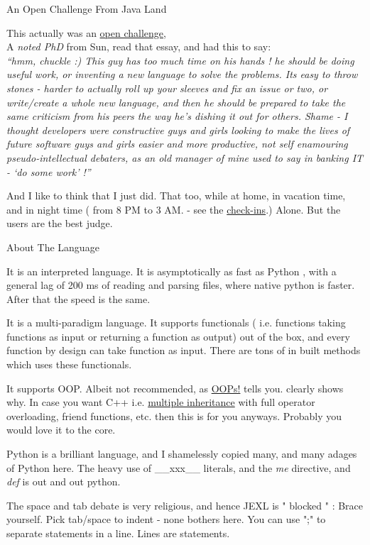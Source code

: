 \begin{subsection}{An Open Challenge From Java Land}

This actually was an \href{http://steve-yegge.blogspot.in/2006/03/execution-in-kingdom-of-nouns.html}{open challenge},\\
A \emph{noted PhD} from Sun, read that essay, and had this to say: \\

\emph{ 
``hmm, chuckle :) This guy has too much time on his hands ! he should be doing useful work, or inventing a new language to solve the problems. Its easy to throw stones - harder to actually roll up your sleeves and fix an issue or two, or write/create a whole new language, and then he should be prepared to take the same criticism from his peers the way he's dishing it out for others. Shame - I thought developers were constructive guys and girls looking to make the lives of future software guys and girls easier and more productive, not self enamouring pseudo-intellectual debaters, as an old manager of mine used to say in banking IT - `do some work' !''}


And I like to think that I just did. That too, while at home, in vacation time, and in night time 
( from 8 PM to 3 AM. - see the \href{https://github.com/nmondal/njexl/commits/master}{check-ins}.)
Alone. But the users are the best judge.

\end{subsection}


\begin{subsection}{About The Language}

It is an interpreted language. It is asymptotically as fast as Python , with a general lag of 200 ms of reading and parsing files, where native python is faster. After that the speed is the same.
 
It is a multi-paradigm language. It supports functionals ( i.e. functions taking functions as input or returning a function
as output) out of the box, and every function by design can take function as input. 
There are tons of in built methods which uses these functionals.

It supports OOP. Albeit not recommended, as \href{http://harmful.cat-v.org/software/OO_programming/why_oo_sucks}{OOPs!} tells you.
clearly shows why. In case you want C++ i.e.  \href{http://en.wikipedia.org/wiki/Multiple_inheritance}{multiple inheritance} with full operator overloading, friend functions, etc. then this is for you anyways. 
Probably you would love it to the core.

Python is a brilliant language, and I shamelessly copied many, and many adages of Python here. The heavy use of  \_\_xxx\_\_    
literals, and the \emph{me} directive, and \emph{def} is out and out python. 

The space and tab debate is very religious, and hence JEXL is "{ blocked }" : Brace yourself.
Pick tab/space to indent - none bothers here.
You can use ";" to separate statements in a line. 
Lines are statements.

\end{subsection}

